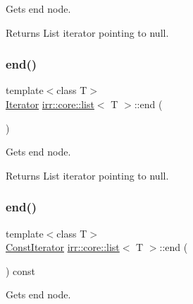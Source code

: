 Gets end node. 

\begin{DoxyReturn}{Returns}
List iterator pointing to null. 
\end{DoxyReturn}
\mbox{\label{classirr_1_1core_1_1list_aa80509dac5224fa57cc548e39480a115}} 
\subsubsection{\texorpdfstring{end()}{end()}\hspace{0.1cm}{\footnotesize\ttfamily [2/4]}}
{\footnotesize\ttfamily template$<$class T$>$ \\
\hyperlink{classirr_1_1core_1_1list_1_1Iterator}{Iterator} \hyperlink{classirr_1_1core_1_1list}{irr\+::core\+::list}$<$ T $>$\+::end (\begin{DoxyParamCaption}{ }\end{DoxyParamCaption})\hspace{0.3cm}{\ttfamily [inline]}}



Gets end node. 

\begin{DoxyReturn}{Returns}
List iterator pointing to null. 
\end{DoxyReturn}
\mbox{\label{classirr_1_1core_1_1list_a6209ac37decfb5f29da921ea40b46e10}} 
\subsubsection{\texorpdfstring{end()}{end()}\hspace{0.1cm}{\footnotesize\ttfamily [3/4]}}
{\footnotesize\ttfamily template$<$class T$>$ \\
\hyperlink{classirr_1_1core_1_1list_1_1ConstIterator}{Const\+Iterator} \hyperlink{classirr_1_1core_1_1list}{irr\+::core\+::list}$<$ T $>$\+::end (\begin{DoxyParamCaption}{ }\end{DoxyParamCaption}) const\hspace{0.3cm}{\ttfamily [inline]}}



Gets end node. 


